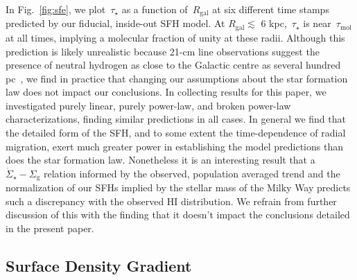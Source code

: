 \documentclass[fleqn, usenatbib]{mnras}
\begin{document}
In Fig.~\ref{fig:sfe}, we plot~$\tau_\star$ as a function of~$R_\text{gal}$ at 
six different time stamps predicted by our fiducial, inside-out SFH model. At 
$R_\text{gal} \lesssim$ 6 kpc,~$\tau_\star$ is near~$\tau_\text{mol}$ at all 
times, implying a molecular fraction of unity at these radii. Although this 
prediction is likely unrealistic because 21-cm line observations suggest the 
presence of neutral hydrogen as close to the Galactic centre as several hundred 
pc~\citep{Kalberla2009}, we find in practice that changing our assumptions 
about the star formation law does not impact our conclusions. In collecting 
results for this paper, we investigated purely linear, purely power-law, and 
broken power-law characterizations, finding similar predictions in all cases. 
In general we find that the detailed form of the SFH, and to some extent the 
time-dependence of radial migration, exert much greater power in establishing 
the model predictions than does the star formation law. Nonetheless it is an 
interesting result that a~$\dot{\Sigma}_\star - \Sigma_\text{g}$ relation 
informed by the observed, population averaged trend and the normalization of 
our SFHs implied by the stellar mass of the Milky Way predicts such a 
discrepancy with the observed HI distribution. We refrain from further 
discussion of this with the finding that it doesn't impact the conclusions 
detailed in the present paper. 

\subsection{Surface Density Gradient} 
\label{sec:methods:surface_density_gradient} 
\end{document}
